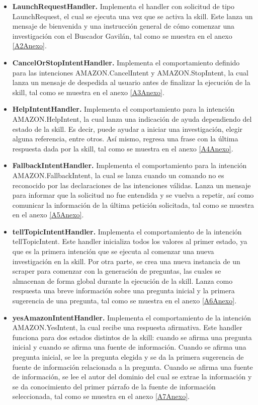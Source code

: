 \begin{itemize}
  \item \textbf{LaunchRequestHandler.} Implementa el handler con solicitud de tipo LaunchRequest, el cual se ejecuta una vez que se activa la skill. Este lanza un mensaje de bienvenida y una instrucción general de cómo comenzar una investigación con el Buscador Gavilán, tal como se muestra en el anexo \ref{A2Anexo}.
  \item \textbf{CancelOrStopIntentHandler.} Implementa el comportamiento definido para las intenciones AMAZON.CancelIntent y AMAZON.StopIntent, la cual lanza un mensaje de despedida al usuario antes de finalizar la ejecución de la skill, tal como se muestra en el anexo \ref{A3Anexo}.
  \item \textbf{HelpIntentHandler.} Implementa el comportamiento para la intención AMAZON.HelpIntent, la cual lanza una indicación de ayuda dependiendo del estado de la skill. Es decir, puede ayudar a iniciar una investigación, elegir alguna referencia, entre otros. Así mismo, regresa una frase con la última respuesta dada por la skill, tal como se muestra en el anexo \ref{A4Anexo}.
  \item \textbf{FallbackIntentHandler.} Implementa el comportamiento para la intención AMAZON.FallbackIntent, la cual se lanza cuando un comando no es reconocido por las declaraciones de las intenciones válidas. Lanza un mensaje para informar que la solicitud no fue entendida y se vuelva a repetir, así como comunicar la información de la última petición solicitada, tal como se muestra en el anexo \ref{A5Anexo}.
  \item \textbf{tellTopicIntentHandler.} Implementa el comportamiento de la intención tellTopicIntent. Este handler inicializa todos los valores al primer estado, ya que es la primera intención que se ejecuta al comenzar una nueva investigación en la skill. Por otra parte, se crea una nueva instancia de un scraper para comenzar con la generación de preguntas, las cuales se almacenan de forma global durante la ejecución de la skill. Lanza como respuesta una breve información sobre una pregunta inicial y la primera sugerencia de una pregunta, tal como se muestra en el anexo \ref{A6Anexo}.
  \item \textbf{yesAmazonIntentHandler.} Implementa el comportamiento de la intención AMAZON.YesIntent, la cual recibe una respuesta afirmativa. Este handler funciona para dos estados distintos de la skill: cuando se afirma una pregunta inicial y cuando se afirma una fuente de información. Cuando se afirma una pregunta inicial, se lee la pregunta elegida y se da la primera sugerencia de fuente de información relacionada a la pregunta. Cuando se afirma una fuente de información, se lee el autor del dominio del cual se extrae la información y se da conocimiento del primer párrafo de la fuente de información seleccionada, tal como se muestra en el anexo \ref{A7Anexo}.

\end{itemize}
